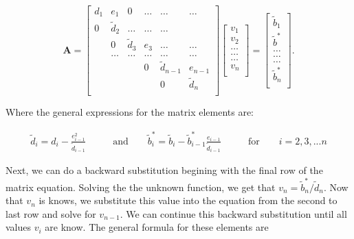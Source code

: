 \documentclass[%
oneside,                 %
final,                   %
10pt]{article}
\begin{document}
\[
    \mathbf{A} = \begin{bmatrix}
                           d_1& e_1 & 0 &\dots   & \dots &\dots \\
                           0 & \tilde{d}_2 &\dots &\dots &\dots \\
                           & 0 & \tilde{d}_3 & e_3 & \dots & \dots \\
                           & \dots   & \dots &\dots   &\dots & \dots \\
                           &   &  & 0  &\tilde{d}_{n-1}& e_{n-1} \\
                           &    &  &   &0 & \tilde{d}_n \\
                      \end{bmatrix}\begin{bmatrix}
                           v_1\\
                           v_2\\
                           \dots \\
                          \dots  \\
                          \dots \\
                           v_n\\
                      \end{bmatrix}
  =\begin{bmatrix}
                           \tilde{b}_1\\
                           \tilde{b}^*\\
                           \dots \\
                           \dots \\
                          \dots \\
                           \tilde{b}^*_n\\
                      \end{bmatrix}.
\]

Where the general expressions for the matrix elements are:


\begin{align*}
\tilde{d}_i = d_i - \frac{e^2_{i-1}}{\tilde{d}_{i-1}} &\qquad\text{and}\qquad \tilde{b}^*_i = \tilde{b}_i - \tilde{b}_{i-1}^* \frac{e_{i-1}}{\tilde{d}_{i-1}} &\qquad\text{for}\qquad i=2,3,...n
\end{align*}

Next, we can do a backward substitution begining with the final row of the matrix equation.  Solving the the unknown function, we get that $v_n=\tilde{b}^*_n/\tilde{d}_n$.  Now that $v_n$ is knows, we substitute this value into the equation from the second to last row and solve for $v_{n-1}$.  We can continue this backward substitution until all values $v_i$ are know.  The general formula for these elements are
\end{document}
